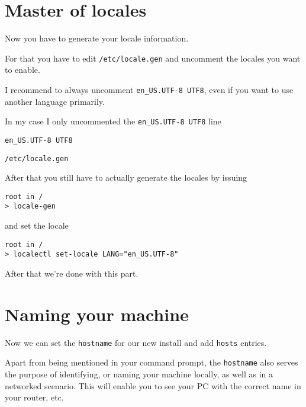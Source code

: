 \documentclass[10pt]{dustdoc}
\begin{document}
\section{Master of locales}%
\label{sec:master-of-locales}

Now you have to generate your locale information.

For that you have to edit \texttt{/etc/locale.gen} and uncomment the locales you want to enable.

\begin{NOTE}
    I recommend to always uncomment \texttt{en_US.UTF-8 UTF8}, even if you want to use another language primarily.
\end{NOTE}

In my case I only uncommented the \texttt{en_US.UTF-8 UTF8} line

\begin{mintedlisting}
    \begin{verbatim}
en_US.UTF-8 UTF8
    \end{verbatim}

    \caption{\texttt{/etc/locale.gen}}
\end{mintedlisting}

After that you still have to actually generate the locales by issuing

\begin{verbatim}
root in /
> locale-gen
\end{verbatim}

\noindent
and set the locale

\begin{verbatim}
root in /
> localectl set-locale LANG="en_US.UTF-8"
\end{verbatim}

After that we’re done with this part.

\section{Naming your machine}%
\label{sec:naming-your-machine}

Now we can set the \texttt{hostname} for our new install and add \texttt{hosts} entries.

Apart from being mentioned in your command prompt, the \texttt{hostname} also serves the purpose of identifying, or naming your machine locally, as well as in a networked scenario.  This will enable you to see your PC with the correct name in your router, etc.
\end{document}
